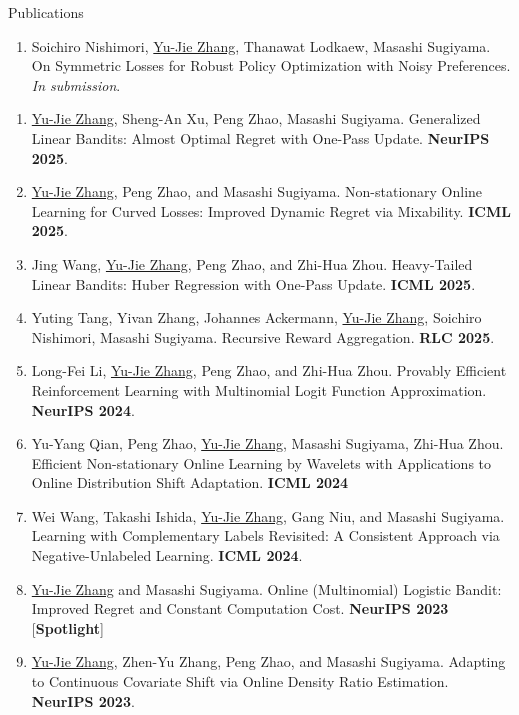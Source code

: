 \documentclass{resume} %
\begin{document}
\begin{rSection}{Publications}
\begin{enumerate}[leftmargin=0.2in]
	\item Soichiro Nishimori, \underline{Yu-Jie Zhang}, Thanawat Lodkaew, Masashi Sugiyama. On Symmetric Losses for Robust Policy Optimization with Noisy Preferences. \emph{In submission}.
\end{enumerate}

\begin{enumerate}[leftmargin=0.2in]

	\item	\underline{Yu-Jie Zhang}, Sheng-An Xu, Peng Zhao, Masashi Sugiyama. Generalized Linear Bandits: Almost Optimal Regret with One-Pass Update. \textbf{NeurIPS 2025}. 

	\item \underline{Yu-Jie Zhang}, Peng Zhao, and Masashi Sugiyama. Non-stationary Online Learning for Curved Losses: Improved Dynamic Regret via Mixability. \textbf{ICML 2025}. 
	
	\item Jing Wang, \underline{Yu-Jie Zhang}, Peng Zhao, and Zhi-Hua Zhou. Heavy-Tailed Linear Bandits: Huber Regression with One-Pass Update. \textbf{ICML 2025}.

	\item Yuting Tang, Yivan Zhang, Johannes Ackermann, \underline{Yu-Jie Zhang}, Soichiro Nishimori, Masashi Sugiyama. Recursive Reward Aggregation. \textbf{RLC 2025}.
	
	\item Long-Fei Li, \underline{Yu-Jie Zhang}, Peng Zhao, and Zhi-Hua Zhou. Provably Efficient Reinforcement Learning with Multinomial Logit Function Approximation. \textbf{NeurIPS 2024}.
	
	\item Yu-Yang Qian, Peng Zhao, \underline{Yu-Jie Zhang}, Masashi Sugiyama, Zhi-Hua Zhou. Efficient Non-stationary Online Learning by Wavelets with Applications to Online Distribution Shift Adaptation. \textbf{ICML 2024}
	
	\item Wei Wang, Takashi Ishida, \underline{Yu-Jie Zhang}, Gang Niu, and Masashi Sugiyama. Learning with Complementary Labels Revisited: A Consistent Approach via Negative-Unlabeled Learning. \textbf{ICML 2024}.
	 	 
	\item \underline{Yu-Jie Zhang} and Masashi Sugiyama. Online (Multinomial) Logistic Bandit: Improved Regret and Constant Computation Cost. \textbf{NeurIPS 2023} {\color{darkred}[\textbf{Spotlight}]}
	\item \underline{Yu-Jie Zhang}, Zhen-Yu Zhang, Peng Zhao, and Masashi Sugiyama. Adapting to Continuous Covariate Shift via Online Density Ratio Estimation. \textbf{NeurIPS 2023}.
	

\end{enumerate}
\end{rSection}
\end{document}
